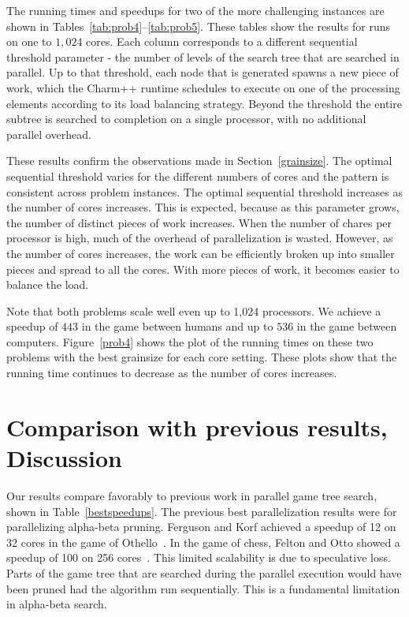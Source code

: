 \documentclass[10pt, conference, compsocconf]{IEEEtran}
\begin{document}
The running times and speedups for two of the more challenging instances are shown in Tables~\ref{tab:prob4}--\ref{tab:prob5}.   These tables
show the results for runs on one to $1,024$ cores.  Each column corresponds to
a different sequential threshold parameter - the number of
levels of the search tree that are searched in parallel.  Up to that threshold,
each node that is generated spawns a new piece of work, which the {\sc Charm++}
runtime schedules to execute on one of the processing elements according to its
load balancing strategy.  Beyond the threshold the entire subtree is searched to
completion on a single processor, with no additional parallel overhead. 

These results confirm the observations made in Section~\ref{grainsize}. The optimal sequential threshold varies for the different numbers of cores and
the pattern is consistent across problem instances.  The optimal
sequential threshold increases as the number of cores increases.  This is expected,
because as this parameter grows, the number of distinct pieces of work
increases.  When the number of chares per processor is high, much of
the overhead of parallelization is wasted.  However, as the number of cores
increases, the work can be efficiently broken up into smaller pieces and spread to all the cores.  With more pieces of work, it becomes easier to balance
the load.



Note that both problems scale well even up to 1,024 processors.  We achieve a
speedup of $443$ in the game between humans and up to $536$ in the game between
computers.  Figure~\ref{prob4} shows the plot of the running
times on these two problems with the best grainsize for each core setting.  These plots show that the
running time continues to decrease as the number of cores increases.

\section{Comparison with previous results, Discussion}
\label{discuss}
Our results compare favorably to previous work in parallel game tree search,
shown in Table~\ref{bestspeedups}.  The previous best parallelization results
were for parallelizing alpha-beta pruning.  Ferguson and Korf achieved a
speedup of 12 on 32 cores in the game of Othello~\cite{ferguson88distributed}.
In the game of chess, Felton and Otto showed a speedup of 100 on 256
cores~\cite{felten88highly}.  This limited scalability is due to speculative
loss.  Parts of the game tree that are searched during the parallel execution
would have been pruned had the algorithm run sequentially.  This is a
fundamental limitation in alpha-beta search. 
\end{document}
